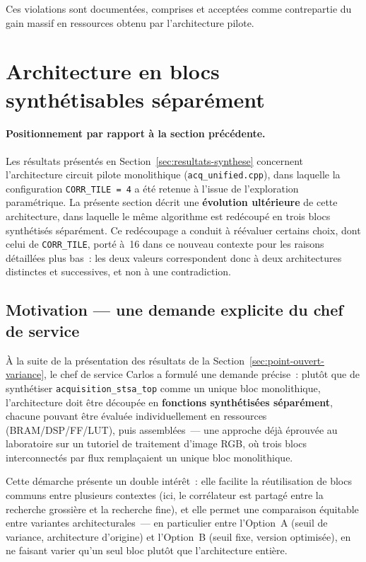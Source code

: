 \documentclass[11pt,a4paper]{article}
\providecommand{\og}{\guillemotleft{}}
\providecommand{\fg}{\guillemotright{}}
\begin{document}
Ces violations sont documentées, comprises et acceptées comme contrepartie du gain massif en ressources obtenu par l'architecture pilote.

\section{Architecture en blocs synthétisables séparément}
\label{sec:blocs-separes}

\paragraph{Positionnement par rapport à la section précédente.}
Les résultats présentés en Section~\ref{sec:resultats-synthese} concernent l'architecture \og{}circuit pilote\fg{} monolithique (\texttt{acq\_unified.cpp}), dans laquelle la configuration \texttt{CORR\_TILE~=~4} a été retenue à l'issue de l'exploration paramétrique. La présente section décrit une \textbf{évolution ultérieure} de cette architecture, dans laquelle le même algorithme est redécoupé en trois blocs synthétisés séparément. Ce redécoupage a conduit à réévaluer certains choix, dont celui de \texttt{CORR\_TILE}, porté à~16 dans ce nouveau contexte pour les raisons détaillées plus bas~: les deux valeurs correspondent donc à deux architectures distinctes et successives, et non à une contradiction.

\subsection{Motivation --- une demande explicite du chef de service}

À la suite de la présentation des résultats de la Section~\ref{sec:point-ouvert-variance}, le chef de service Carlos a formulé une demande précise~: plutôt que de synthétiser \texttt{acquisition\_stsa\_top} comme un unique bloc monolithique, l'architecture doit être découpée en \textbf{fonctions synthétisées séparément}, chacune pouvant être évaluée individuellement en ressources (BRAM/DSP/FF/LUT), puis assemblées~--- une approche déjà éprouvée au laboratoire sur un tutoriel de traitement d'image RGB, où trois blocs interconnectés par flux remplaçaient un unique bloc monolithique.

Cette démarche présente un double intérêt~: elle facilite la réutilisation de blocs communs entre plusieurs contextes (ici, le corrélateur est partagé entre la recherche grossière et la recherche fine), et elle permet une comparaison équitable entre variantes architecturales~--- en particulier entre l'Option~A (seuil de variance, architecture d'origine) et l'Option~B (seuil fixe, version optimisée), en ne faisant varier qu'un seul bloc plutôt que l'architecture entière.
\end{document}
